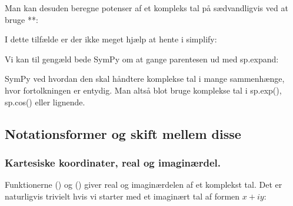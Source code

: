 \documentclass[letterpaper,10pt,english]{jupyterBook}
\begin{document}
Man kan desuden beregne potenser af et kompleks tal på sædvandligvis ved at bruge **:

\begin{sphinxVerbatim}[commandchars=\\\{\}]
  
\end{sphinxVerbatim}

\noindent{}

I dette tilfælde er der ikke meget hjælp at hente i simplify:

\begin{sphinxVerbatim}[commandchars=\\\{\}]
  
\end{sphinxVerbatim}

\noindent{}

Vi kan til gengæld bede SymPy om at gange parentesen ud med sp.expand:

\begin{sphinxVerbatim}[commandchars=\\\{\}]
  
\end{sphinxVerbatim}

\noindent{}

SymPy ved hvordan den skal håndtere komplekse tal i mange sammenhænge, hvor fortolkningen er entydig. Man altså blot bruge komplekse tal i sp.exp(), sp.cos() eller lignende.


\subsection{Notationsformer og skift mellem disse}
\label{\detokenize{notebooks/sympy/Notebook_kompleks:notationsformer-og-skift-mellem-disse}}

\subsubsection{Kartesiske koordinater, real og imaginærdel.}
\label{\detokenize{notebooks/sympy/Notebook_kompleks:kartesiske-koordinater-real-og-imaginaerdel}}
Funktionerne () og () giver real\sphinxhyphen{} og imaginærdelen af et komplekst tal. Det er naturligvis trivielt hvis vi starter med et imaginært tal af formen \(x + iy\):
\end{document}
